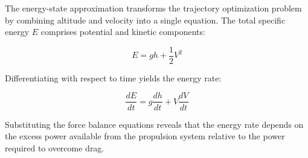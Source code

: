 The energy-state approximation transforms the trajectory optimization problem by combining altitude and velocity into a single equation. The total specific energy $E$ comprises potential and kinetic components:

\begin{equation}
E = gh + \frac{1}{2}V^2
\end{equation}

Differentiating with respect to time yields the energy rate:

\begin{equation}
\frac{dE}{dt} = g\frac{dh}{dt} + V\frac{dV}{dt}
\end{equation}

Substituting the force balance equations reveals that the energy rate depends on the excess power available from the propulsion system relative to the power required to overcome drag.
